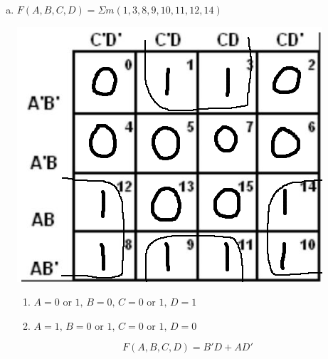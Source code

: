 \documentclass[11pt]{article}
\begin{document}
\begin{enumerate}[a)]
    \item
    $F(A,B,C,D) = \Sigma m(1,3,8,9,10,11,12,14)$
    \vspace{-15pt}\begin{center}
        \includegraphics[scale=0.35]{2b.png}
    \end{center}
    \vspace{-20pt}\begin{enumerate}[$\bullet$]
        \item $A=0$ or $1,\,B=0,\,C=0$ or $1,\,D=1$
        \item \vspace{-5pt}$A=1,\,B=0$ or $1,\,C=0$ or $1,\,D=0$
    \end{enumerate}
    $$F(A,B,C,D) = B'D + AD'$$
    \pagebreak


\end{enumerate}
\end{document}
